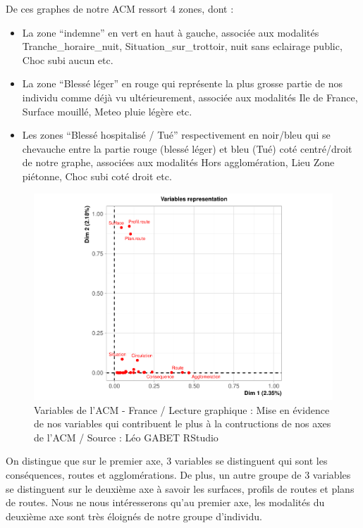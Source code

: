 \documentclass[french,]{compterendu}
\providecommand{\tightlist}{%
  \setlength{\itemsep}{0pt}\setlength{\parskip}{0pt}}
\theoremstyle{urcastyle}
\theoremstyle{remark}
\begin{document}
De ces graphes de notre ACM ressort 4 zones, dont :

\begin{itemize}
\tightlist
\item
  La zone ``indemne'' en vert en haut à gauche, associée aux modalités Tranche\_horaire\_nuit, Situation\_sur\_trottoir, nuit sans eclairage public, Choc subi aucun etc.
\item
  La zone ``Blessé léger'' en rouge qui représente la plus grosse partie de nos individu comme déjà vu ultérieurement, associée aux modalités Ile de France, Surface mouillé, Meteo pluie légère etc.
\item
  Les zones ``Blessé hospitalisé / Tué'' respectivement en noir/bleu qui se chevauche entre la partie rouge (blessé léger) et bleu (Tué) coté centré/droit de notre graphe, associées aux modalités Hors agglomération, Lieu Zone piétonne, Choc subi coté droit etc.
\end{itemize}

\begin{figure}[H]

{\centering \includegraphics[width=0.9\linewidth]{Rapport_ADD_LEO-GABET_files/figure-latex/acm1moda-1} 

}

\caption{Variables de l'ACM - France / Lecture graphique : Mise en évidence de nos variables qui contribuent le plus à la contructions de nos axes de l'ACM / Source : Léo GABET RStudio}\label{fig:acm1moda}
\end{figure}

On distingue que sur le premier axe, 3 variables se distinguent qui sont les conséquences, routes et agglomérations. De plus, un autre groupe de 3 variables se distinguent sur le deuxième axe à savoir les surfaces, profils de routes et plans de routes.
Nous ne nous intéresserons qu'au premier axe, les modalités du deuxième axe sont très éloignés de notre groupe d'individu.
\end{document}
